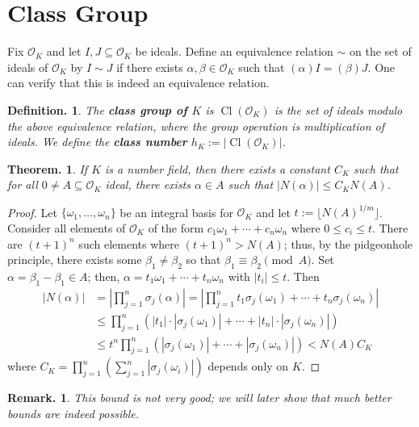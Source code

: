 \documentclass[11pt, a4paper]{memoir}
\theoremstyle{change}
\newtheorem{theorem}{Theorem.}[section]
\theoremstyle{plain}
\theoremstyle{nonumberplain}
\newtheorem{definition}{Definition.}
\newtheorem{remark}{Remark.}
\newtheorem{proof}{Proof}
\DeclareMathOperator{\Cl}{Cl}
\newcommand{\mbf}[1]{{\boldmath\bfseries #1}}
\numberwithin{equation}{section}
\begin{document}
\section{Class Group}
Fix $\mathcal{O}_K$ and let $I,J\subseteq\mathcal{O}_K$ be ideals.
Define an equivalence relation $\sim$ on the set of ideals of $\mathcal{O}_K$ by $I\sim J$ if there exists $\alpha,\beta\in\mathcal{O}_K$ such that $(\alpha)I=(\beta)J$.
One can verify that this is indeed an equivalence relation.
\begin{definition}
    The \mbf{class group of $K$} is $\Cl(\mathcal{O}_K)$ is the set of ideals modulo the above equivalence relation, where the group operation is multiplication of ideals.
    We define the \mbf{class number} $h_K:=|\Cl(\mathcal{O}_K)|$.
\end{definition}
\begin{theorem}\label{t:ck}
    If $K$ is a number field, then there exists a constant $C_K$ such that for all $0\neq A\subseteq\mathcal{O}_K$ ideal, there exists $\alpha\in A$ such that $|N(\alpha)|\leq C_K N(A)$.
\end{theorem}
\begin{proof}
    Let $\{\omega_1,\ldots,\omega_n\}$ be an integral basis for $\mathcal{O}_K$ and let $t:=\lfloor N(A)^{1/m}\rfloor$.
    Consider all elements of $\mathcal{O}_K$ of the form $c_1\omega_1+\cdots+c_n\omega_n$ where $0\leq c_i\leq t$.
    There are $(t+1)^n$ such elements where $(t+1)^n>N(A)$; thus, by the pidgeonhole principle, there exists some $\beta_1\neq\beta_2$ so that $\beta_1\equiv\beta_2\pmod{A}$.
    Set $\alpha=\beta_1-\beta_1\in A$; then, $\alpha=t_1\omega_1+\cdots+t_n\omega_n$ with $|t_i|\leq t$.
    Then
    \begin{align*}
        |N(\alpha)| &= \left\lvert\prod_{j=1}^n\sigma_j(\alpha)\right\rvert= \left\lvert\prod_{j=1}^nt_1\sigma_j(\omega_1)+\cdots+t_n\sigma_j(\omega_n)\right\rvert\\
                    &\leq \prod_{j=1}^n\left(|t_1|\cdot|\sigma_j(\omega_1)|+\cdots+|t_n|\cdot|\sigma_j(\omega_n)|\right)\\
                    &\leq t^n\prod_{j=1}^n(|\sigma_j(\omega_1)|+\cdots+|\sigma_j(\omega_n)|)<N(A)C_K
    \end{align*}
    where $C_K=\prod_{j=1}^n\left(\sum_{j=1}^n|\sigma_j(\omega_i)|\right)$ depends only on $K$.
\end{proof}
\begin{remark}
    This bound is not very good; we will later show that much better bounds are indeed possible.
\end{remark}
\end{document}
